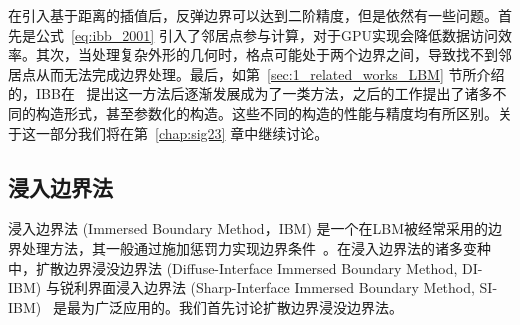 在引入基于距离的插值后，反弹边界可以达到二阶精度，但是依然有一些问题。首先是公式~\ref{eq:ibb_2001} 引入了邻居点参与计算，对于GPU实现会降低数据访问效率。其次，当处理复杂外形的几何时，格点可能处于两个边界之间，导致找不到邻居点从而无法完成边界处理。最后，如第~\ref{sec:1_related_works_LBM} 节所介绍的，IBB在~\citet{Bouzidi-2001} 提出这一方法后逐渐发展成为了一类方法，之后的工作提出了诸多不同的构造形式，甚至参数化的构造。这些不同的构造的性能与精度均有所区别。关于这一部分我们将在第~\ref{chap:sig23} 章中继续讨论。

\subsection{浸入边界法}
浸入边界法 (Immersed Boundary Method，IBM) 是一个在LBM被经常采用的边界处理方法，其一般通过施加惩罚力实现边界条件~\citep{Patel-2018,mittal-2008,Li-2020}。在浸入边界法的诸多变种中，扩散边界浸没边界法 (Diffuse-Interface Immersed Boundary Method, DI-IBM) 与锐利界面浸入边界法 (Sharp-Interface Immersed Boundary Method, SI-IBM)~\citep{mittal-2008} 是最为广泛应用的。我们首先讨论扩散边界浸没边界法。

